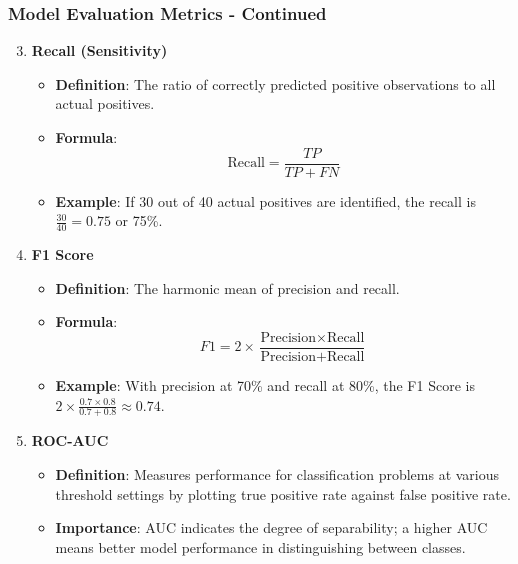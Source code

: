 \documentclass[aspectratio=169]{beamer}
\begin{document}
\begin{frame}[fragile]
    \frametitle{Model Evaluation Metrics - Continued}
    \begin{enumerate}
        \setcounter{enumi}{2}
        \item \textbf{Recall (Sensitivity)}
        \begin{itemize}
            \item \textbf{Definition}: The ratio of correctly predicted positive observations to all actual positives.
            \item \textbf{Formula}:
            \begin{equation}
            \text{Recall} = \frac{TP}{TP + FN}
            \end{equation}
            \item \textbf{Example}: If 30 out of 40 actual positives are identified, the recall is \( \frac{30}{40} = 0.75\) or 75\%.
        \end{itemize}
        
        \item \textbf{F1 Score}
        \begin{itemize}
            \item \textbf{Definition}: The harmonic mean of precision and recall.
            \item \textbf{Formula}:
            \begin{equation}
            F1 = 2 \times \frac{\text{Precision} \times \text{Recall}}{\text{Precision} + \text{Recall}}
            \end{equation}
            \item \textbf{Example}: With precision at 70\% and recall at 80\%, the F1 Score is \( 2 \times \frac{0.7 \times 0.8}{0.7 + 0.8} \approx 0.74\).
        \end{itemize}

        \item \textbf{ROC-AUC}
        \begin{itemize}
            \item \textbf{Definition}: Measures performance for classification problems at various threshold settings by plotting true positive rate against false positive rate.
            \item \textbf{Importance}: AUC indicates the degree of separability; a higher AUC means better model performance in distinguishing between classes.
        \end{itemize}
    \end{enumerate}
\end{frame}
\end{document}
